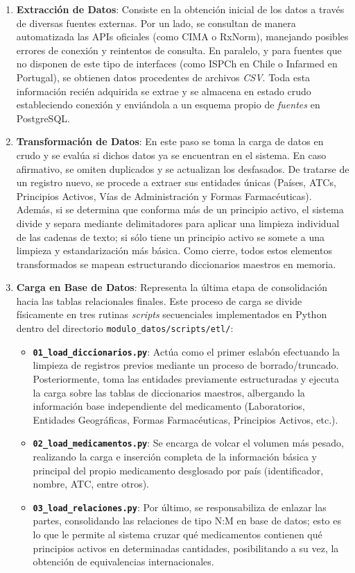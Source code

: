 \documentclass[11pt,a4paper]{article}
\begin{document}
\begin{enumerate}
    \item \textbf{Extracción de Datos}: Consiste en la obtención inicial de los datos a través de diversas fuentes externas. Por un lado, se consultan de manera automatizada las APIs oficiales (como CIMA o RxNorm), manejando posibles errores de conexión y reintentos de consulta. En paralelo, y para fuentes que no disponen de este tipo de interfaces (como ISPCh en Chile o Infarmed en Portugal), se obtienen datos procedentes de archivos \textit{CSV}. Toda esta información recién adquirida se extrae y se almacena en estado crudo estableciendo conexión y enviándola a un esquema propio de \textit{fuentes} en PostgreSQL.
    
    \item \textbf{Transformación de Datos}: En este paso se toma la carga de datos en crudo y se evalúa si dichos datos ya se encuentran en el sistema. En caso afirmativo, se omiten duplicados y se actualizan los desfasados. De tratarse de un registro nuevo, se procede a extraer sus entidades únicas (Países, ATCs, Principios Activos, Vías de Administración y Formas Farmacéuticas). Además, si se determina que conforma más de un principio activo, el sistema divide y separa mediante delimitadores para aplicar una limpieza individual de las cadenas de texto; si sólo tiene un principio activo se somete a una limpieza y estandarización más básica. Como cierre, todos estos elementos transformados se mapean estructurando diccionarios maestros en memoria.
    
    \item \textbf{Carga en Base de Datos}: Representa la última etapa de consolidación hacia las tablas relacionales finales. Este proceso de carga se divide físicamente en tres rutinas \textit{scripts} secuenciales implementados en Python dentro del directorio \texttt{modulo\_datos/scripts/etl/}:
    \begin{itemize}
        \item \textbf{\texttt{01\_load\_diccionarios.py}}: Actúa como el primer eslabón efectuando la limpieza de registros previos mediante un proceso de borrado/truncado. Posteriormente, toma las entidades previamente estructuradas y ejecuta la carga sobre las tablas de diccionarios maestros, albergando la información base independiente del medicamento (Laboratorios, Entidades Geográficas, Formas Farmacéuticas, Principios Activos, etc.).
        \item \textbf{\texttt{02\_load\_medicamentos.py}}: Se encarga de volcar el volumen más pesado, realizando la carga e inserción completa de la información básica y principal del propio medicamento desglosado por país (identificador, nombre, ATC, entre otros).
        \item \textbf{\texttt{03\_load\_relaciones.py}}: Por último, se responsabiliza de enlazar las partes, consolidando las relaciones de tipo N:M en base de datos; esto es lo que le permite al sistema cruzar qué medicamentos contienen qué principios activos en determinadas cantidades, posibilitando a su vez, la obtención de equivalencias internacionales.
    \end{itemize}
\end{enumerate}
\end{document}
